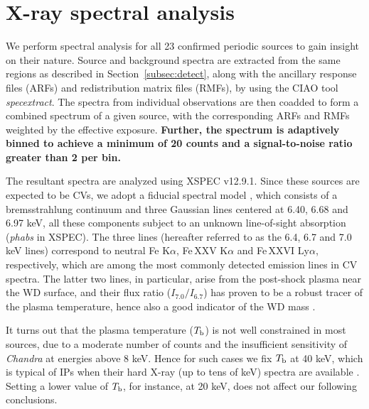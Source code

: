 \documentclass[twoside,twocolumn]{aastex63}
\begin{document}
\section{X-ray spectral analysis}\label{sec:spectra}
We perform spectral analysis for all 23 confirmed periodic sources to gain insight on their nature. Source and background spectra are extracted from the same regions as described in Section~\ref{subsec:detect}, along with the ancillary response files (ARFs) and redistribution matrix files (RMFs), by using the CIAO tool \emph{specextract}. 
The spectra from individual observations are then coadded to form a combined spectrum of a given source, with the corresponding ARFs and RMFs weighted by the effective exposure. 
{\bf Further, the spectrum is adaptively binned to achieve a minimum of 20 counts and a signal-to-noise ratio greater than 2 per bin.}

The resultant spectra are analyzed using XSPEC v12.9.1.
Since these sources are expected to be CVs, we adopt a fiducial spectral model \citep{2018ApJS..235...26Z,2019ApJ...882..164X}, which consists of a bremsstrahlung continuum and three Gaussian lines centered at 6.40, 6.68 and 6.97 keV, all these components subject to an unknown line-of-sight absorption (\emph{phabs} in XSPEC). 
The three lines (hereafter referred to as the 6.4, 6.7 and 7.0 keV lines) correspond to neutral Fe K$\alpha$, Fe\,XXV K$\alpha$ and Fe\,XXVI Ly$\alpha$, respectively, which are among the most commonly detected emission lines in CV spectra. The latter two lines, in particular, arise from the post-shock plasma near the WD surface, and their flux ratio ($I_{7.0}/I_{6.7}$) has proven to be a robust tracer of the plasma temperature, hence also a good indicator of the WD mass \citep{2016ApJ...818..136X}.

It turns out that the plasma temperature ($T_{\rm b}$) is not well constrained in most sources, due to a moderate number of counts and the insufficient sensitivity of {\it Chandra} at energies above 8 keV. Hence for such cases we fix $T_{\rm b}$ at 40 keV, which is typical of IPs when their hard X-ray (up to tens of keV) spectra are available \citep{2016ApJ...818..136X,2016ApJ...826..160H}.
Setting a lower value of $T_{\rm b}$, for instance, at 20 keV, does not affect our following conclusions. 
\end{document}
